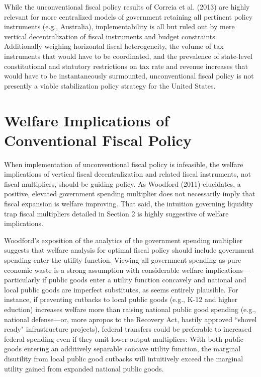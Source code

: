 \documentclass[12pt,letterpaper]{article}
\begin{document}
While the unconventional fiscal policy results of Correia et al. (2013) are highly relevant for more centralized models of government retaining all pertinent policy instruments (e.g., Australia), implementability is all but ruled out by mere vertical decentralization of fiscal instruments and budget constraints. Additionally weighing horizontal fiscal heterogeneity, the volume of tax instruments that would have to be coordinated, and the prevalence of state-level constitutional and statutory restrictions on tax rate and revenue increases that would have to be instantaneously surmounted, unconventional fiscal policy is not presently a viable stabilization policy strategy for the United States.

\section{Welfare Implications of Conventional Fiscal Policy}

When implementation of unconventional fiscal policy is infeasible, the welfare implications of vertical fiscal decentralization and related fiscal instruments, not fiscal multipliers, should be guiding policy. As Woodford (2011) elucidates, a positive, elevated government spending multiplier does not necessarily imply that fiscal expansion is welfare improving. That said, the intuition governing liquidity trap fiscal multipliers detailed in Section 2 is highly suggestive of welfare implications. 

Woodford's exposition of the analytics of the government spending multiplier suggests that welfare analysis for optimal fiscal policy should include government spending enter the utility function. Viewing all government spending as pure economic waste is a strong assumption with considerable welfare implications---particularly if public goods enter a utility function concavely and national and local public goods are imperfect substitutes, as seems entirely plausible. For instance, if preventing cutbacks to local public goods (e.g., K-12 and higher eduction) increases welfare more than raising national public good spending (e.g., national defense---or, more apropos to the Recovery Act, hastily approved ``shovel ready" infrastructure projects), federal transfers could be preferable to increased federal spending even if they omit lower output multipliers: With both public goods entering an additively separable concave utility function, the marginal disutility from local public good cutbacks will intuitively exceed the marginal utility gained from expanded national public goods.
\end{document}
